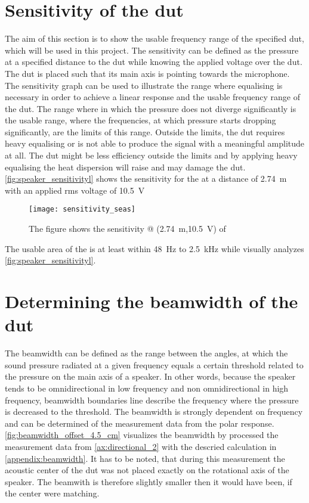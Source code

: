 \section{Sensitivity of the \gls{dut}}
The aim of this section is to show the usable frequency range of the specified \gls{dut}, which will be used in this project. The sensitivity can be defined as the pressure at a specified distance to the \gls{dut} while knowing the applied voltage over the \gls{dut}. The \gls{dut} is placed such that its main axis is pointing towards the microphone. The sensitivity graph can be used to illustrate the range where equalising is necessary in order to achieve a linear response and the usable frequency range of the \gls{dut}. The range where in which the pressure does not diverge significantly is the usable range, where the frequencies, at which pressure starts dropping significantly, are the limits of this range. Outside the limits, the \gls{dut} requires heavy equalising or is not able to produce the signal with a meaningful amplitude at all. The \gls{dut} might be less efficiency outside the limits and by applying heavy equalising the heat dispersion will raise and may damage the \gls{dut}. \autoref{fig:speaker_sensitivityl} shows the sensitivity for the \citep{seas33} at a distance of \SI{2.74}{\meter} with an applied \gls{rms} voltage of \SI{10.5}{\volt}


\begin{figure}[H]
	\centering
	\texttt{[image: sensitivity\_seas]}
	\caption{The figure shows the sensitivity @ (\SI{2.74}{\meter},\SI{10.5}{\volt}) of  \citep{seas33}}
		\label{fig:speaker_sensitivityl}
\end{figure}

The usable area of the \citep{seas33} is at least within \SI{48}{\hertz} to \SI{2.5}{\kilo\hertz} while visually analyzes \autoref{fig:speaker_sensitivityl}.


\section{Determining the beamwidth of the \gls{dut}}\label{sec:beamwidth}
The beamwidth can be defined as the range between the angles, at which the sound pressure radiated at a given frequency equals a certain threshold related to the pressure on the main axis of a speaker. In other words, because the speaker tends to be omnidirectional in low frequency and non omnidirectional in high frequency, beamwidth boundaries line describe the frequency where the pressure is decreased to the threshold. The beamwidth is strongly dependent on frequency and can be determined of the measurement data from the polar response. \autoref{fig:beamwidth_offset_4.5_cm} visualizes the beamwidth by processed the measurement data from \ref{ax:directional_2} with the descried calculation in \autoref{appendix:beamwidth}. It has to be noted, that during this measurement the acoustic center of the \gls{dut} was not placed exactly on the rotational axis of the speaker. The beamwith is therefore slightly smaller then it would have been, if the center were matching.

